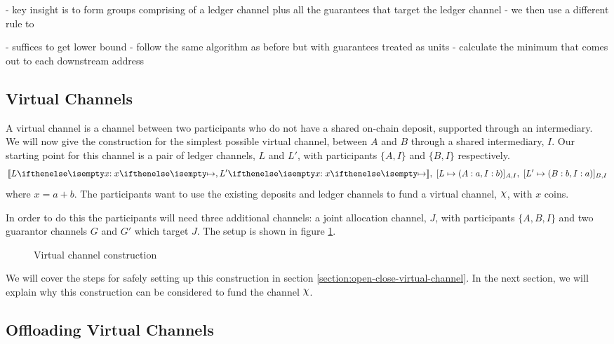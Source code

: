 - key insight is to form groups comprising of a ledger channel plus all the guarantees that target the ledger channel
- we then use a different rule to 


- suffices to get lower bound 
- follow the same algorithm as before but with guarantees treated as units
- calculate the minimum that comes out to each downstream address

\subsection{Virtual Channels}

A virtual channel is a channel between two participants who do not have a shared on-chain deposit, supported through an intermediary.
We will now give the construction for the simplest possible virtual channel, between $A$ and $B$ through a shared intermediary, $I$.
Our starting point for this channel is a pair of ledger channels, $L$ and $L'$, with participants $\{A,I\}$ and $\{B,I\}$ respectively.
\begin{align}
  \adj{\holds{L}{x}{}, \holds{L'}{x}{}}, \; \finalizable{L}{\alloc{A:a, I:b}}{A, I}, \; \finalizable{L'}{\alloc{B: b, I: a}}{B, I} \label{eq:virtual-channel-start-state}
\end{align}
where $x = a + b$.
The participants want to use the existing deposits and ledger channels to fund a virtual channel, $\rchi$, with $x$ coins.

In order to do this the participants will need three additional channels: a joint allocation channel, $J$, with participants $\{A, B, I\}$ and two guarantor channels $G$ and $G'$ which target $J$. The setup is shown in figure \ref{fig:virtual-channel-construction}.

\begin{figure}[ht]
  \centering
  
  \caption{Virtual channel construction}
  \label{fig:virtual-channel-construction}
\end{figure}

We will cover the steps for safely setting up this construction in section \ref{section:open-close-virtual-channel}. 
In the next section, we will explain why this construction can be considered to fund the channel $\rchi$.

\subsection{Offloading Virtual Channels}

